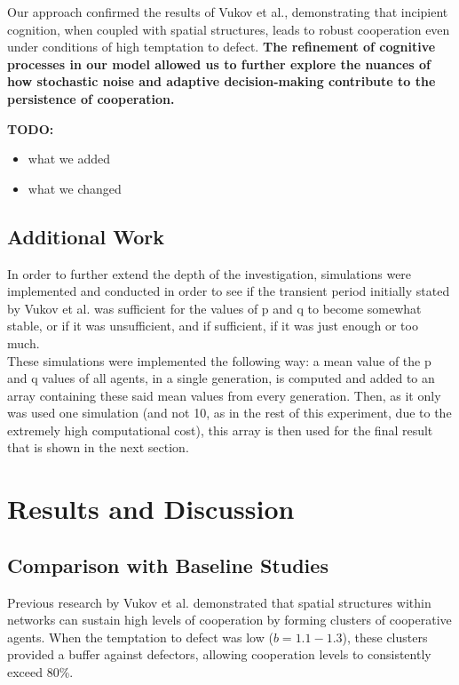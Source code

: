 \documentclass[runningheads]{llncs}
\begin{document}
Our approach confirmed the results of Vukov et al., demonstrating that incipient cognition, when coupled with spatial structures, leads to robust cooperation even under conditions of high temptation to defect. \textbf{The refinement of cognitive processes in our model allowed us to further explore the nuances of how stochastic noise and adaptive decision-making contribute to the persistence of cooperation.}

\textbf{TODO:}
\begin{itemize}
    \item what we added
    \item what we changed
\end{itemize}


\subsection{Additional Work}

In order to further extend the depth of the investigation, simulations were
implemented and conducted in order to see if the transient period initially
stated by Vukov et al. was sufficient for the values of p and q to become
somewhat stable, or if it was unsufficient, and if sufficient, if it was just
enough or too much.\\
These simulations were implemented the following way: a mean value of the
p and q values of all agents, in a single generation, is computed and added to an
array containing these said mean values from every generation. Then, as it only
was used one simulation (and not 10, as in the rest of this experiment, due
to the extremely high computational cost), this array is then used for the
final result that is shown in the next section.



\section{Results and Discussion}

\subsection{Comparison with Baseline Studies}
Previous research by Vukov et al. demonstrated that spatial structures within networks can sustain high levels of cooperation by forming clusters of cooperative agents. When the temptation to defect was low (\( b = 1.1 - 1.3 \)), these clusters provided a buffer against defectors, allowing cooperation levels to consistently exceed 80\%.
\end{document}
